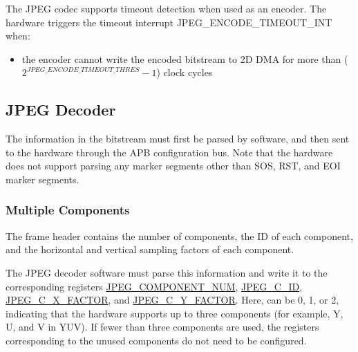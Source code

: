 \documentclass[main\_\_EN.tex]{subfiles}
\begin{document}
The JPEG codec supports timeout detection when used as an encoder. The hardware triggers the timeout interrupt JPEG\_ENCODE\_TIMEOUT\_INT when:
\begin{itemize}
    \item the encoder cannot write the encoded bitstream to 2D DMA for more than ($ 2 ^ {\hyperref[fielddesc:JPEGENCODETIMEOUTTHRES]{JPEG\_ENCODE\_TIMEOUT\_THRES}} - 1 $) clock cycles
\end{itemize}

\subsection{JPEG Decoder}
\label{sec:jpegcodec-dec-mode}

The information in the bitstream must first be parsed by software, and then sent to the hardware through the APB configuration bus. Note that the hardware does not support parsing any marker segments other than SOS, RST, and EOI marker segments.

\subsubsection{Multiple Components}
\label{sec:jpegcodec-dec-color_components}


The frame header contains the number of components, the ID of each component, and the horizontal and vertical sampling factors of each component.

The JPEG decoder software must parse this information and write it to the corresponding registers \hyperref[fielddesc:JPEGCOMPONENTNUM]{JPEG\_COMPONENT\_NUM}, \hyperref[regdesc:JPEGC0REG]{JPEG\_C\_ID}, \hyperref[fielddesc:JPEGC0XFACTOR]{JPEG\_C\_X\_FACTOR}, and \hyperref[fielddesc:JPEGC0YFACTOR]{JPEG\_C\_Y\_FACTOR}. Here,  can be 0, 1, or 2, indicating that the hardware supports up to three components (for example, Y, U, and V in YUV). If fewer than three components are used, the registers corresponding to the unused components do not need to be configured.
\end{document}
